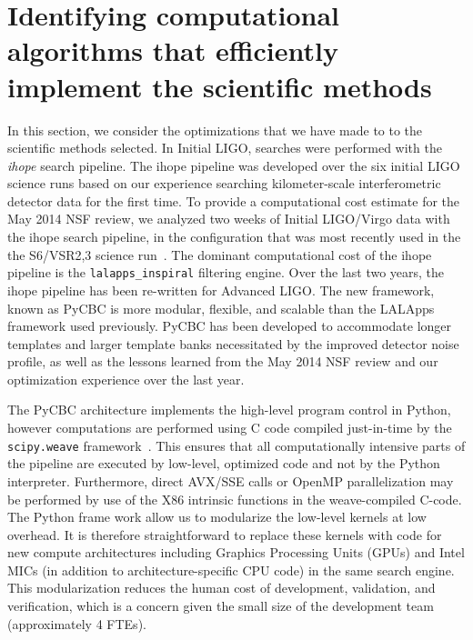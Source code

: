 \vspace*{-10pt}
\section{Identifying computational algorithms that efficiently implement
    the scientific methods}
\vspace*{-5pt}
\label{sec:CompAlgorithms}

In this section, we consider the optimizations that we have made to 
to the scientific methods selected.  In
Initial LIGO, searches were performed with the \textit{ihope} search pipeline.
The ihope pipeline was developed over the six initial LIGO science runs based
on our experience searching kilometer-scale interferometric detector data for
the first time. To provide a computational cost estimate for the May 2014 NSF
review, we analyzed two weeks of Initial LIGO/Virgo data with the ihope search
pipeline, in the configuration that was most recently used in the the
S6/VSR2,3 science run~\cite{Babak:2012zx,Colaboration:2011np}. The dominant
computational cost of the ihope pipeline is the \texttt{lalapps\_inspiral}
filtering engine. Over the last two years, the ihope pipeline has been
re-written for Advanced LIGO. The new framework, known as PyCBC is more modular,
flexible, and scalable than the LALApps framework used previously. PyCBC has
been developed to accommodate longer templates and larger template banks
necessitated by the improved detector noise profile, as well as the lessons
learned from the May 2014 NSF review and our optimization experience over the
last year.

The PyCBC architecture implements the high-level program control in Python,
however computations are performed using C code compiled just-in-time by the
\texttt{scipy.weave} framework~\cite{scipy}.  This ensures that all computationally intensive parts
of the pipeline are executed by low-level, optimized code and not by the
Python interpreter. Furthermore, direct AVX/SSE calls or OpenMP parallelization
may be performed by use of the X86 intrinsic functions in the weave-compiled
C-code.  The Python frame work allow us to modularize the low-level kernels at
low overhead. It is therefore straightforward to replace these kernels with
code for new compute architectures including Graphics Processing Units (GPUs)
and Intel\textsuperscript{\textregistered} MICs (in addition to architecture-specific CPU code) in the same
search engine. This modularization reduces the human cost of development,
validation, and verification, which is a concern given the small size of the
development team (approximately 4 FTEs).

